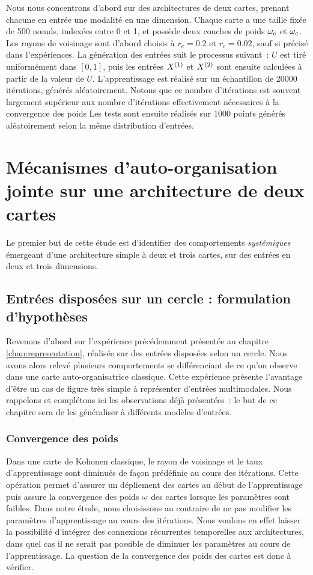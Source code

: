 \documentclass[../main]{subfiles}
\begin{document}
Nous nous concentrons d'abord sur des architectures de deux cartes, prenant chacune en entrée une modalité en une dimension.
Chaque carte a une taille fixée de 500 n\oe{}uds, indexées entre 0 et 1, et possède deux couches de poids $\omega_e$ et $\omega_c$. Les rayons de voisinage sont d'abord choisis à $r_e = 0.2$ et $r_c = 0.02$, sauf si précisé dans l'expériences.
La génération des entrées suit le processus suivant~: $U$ est tiré uniformément dans $[0,1]$, puis les entrées $X^{({1})}$ et $X^{({2})}$ sont ensuite calculées à partir de la valeur de $U$. 
L'apprentissage est réalisé sur un échantillon de 20000 itérations, générés aléatoirement. Notons que ce nombre d'itérations est souvent largement supérieur aux nombre d'itérations effectivement nécessaires à la convergence des poids
Les tests sont ensuite réalisés sur 1000 points générés aléatoirement selon la même distribution d'entrées.

\section{Mécanismes d'auto-organisation jointe sur une architecture de deux cartes}

Le premier but de cette étude est d'identifier des comportements \emph{systémiques} émergeant d'une architecture simple à deux et trois cartes, sur des entrées en deux et trois dimensions.

\subsection{Entrées disposées sur un cercle : formulation d'hypothèses}

Revenons d'abord sur l'expérience précédemment présentée au chapitre \ref{chap:representation}, réalisée sur des entrées disposées selon un cercle.
Nous avons alors relevé plusieurs comportements se différenciant de ce qu'on observe dans une carte auto-organisatrice classique. 
Cette expérience présente l'avantage d'être un cas de figure très simple à représenter d'entrées multimodales.
Nous rappelons et complétons ici les observations déjà présentées~: le but de ce chapitre sera de les généraliser à différents modèles d'entrées.

\subsubsection{Convergence des poids}

Dans une carte de Kohonen classique, le rayon de voisinage et le taux d'apprentissage sont diminués de façon prédéfinie au cours des itérations. 
Cette opération permet d'assurer un dépliement des cartes au début de l'apprentissage puis assure la convergence des poids $\omega$ des cartes lorsque les paramètres sont faibles.
Dans notre étude, nous choisissons au contraire de ne pas modifier les paramètres d'apprentissage au cours des itérations. Nous voulons en effet laisser la possibilité d'intégrer des connexions récurrentes temporelles aux architectures, dans quel cas il ne serait pas possible de diminuer les paramètres au cours de l'apprentissage. La question de la convergence des poids des cartes est donc à vérifier.
\end{document}
